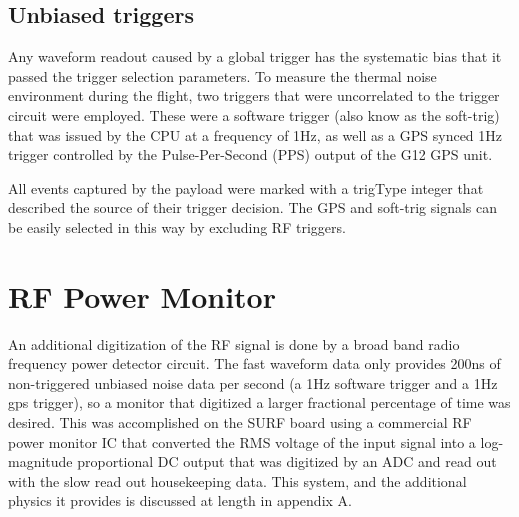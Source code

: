 		
		
		
	\subsection{Unbiased triggers}
		Any waveform readout caused by a global trigger has the systematic bias that it passed the trigger selection parameters.  To measure the thermal noise environment during the flight, two triggers that were uncorrelated to the trigger circuit were employed.  These were a software trigger (also know as the soft-trig) that was issued by the CPU at a frequency of 1Hz, as well as a GPS synced 1Hz trigger controlled by the Pulse-Per-Second (PPS) output of the G12 GPS unit.
		
		All events captured by the payload were marked with a trigType integer that described the source of their trigger decision.  The GPS and soft-trig signals can be easily selected in this way by excluding RF triggers.
		
		
\section{RF Power Monitor}
	An additional digitization of the RF signal is done by a broad band radio frequency power detector circuit.  The fast waveform data only provides 200ns of non-triggered unbiased noise data per second (a 1Hz software trigger and a 1Hz gps trigger), so a monitor that digitized a larger fractional percentage of time was desired.  This was accomplished on the SURF board using a commercial RF power monitor IC that converted the RMS voltage of the input signal into a log-magnitude proportional DC output that was digitized by an ADC and read out with the slow read out housekeeping data.  This system, and the additional physics it provides is discussed at length in appendix A.

